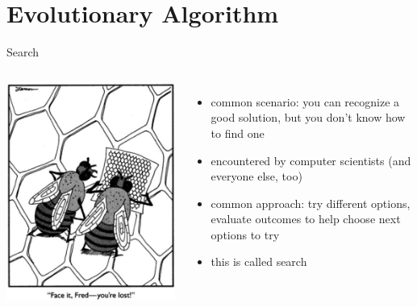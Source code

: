 \section{Evolutionary Algorithm}

\begin{frame}{Search}
  \begin{columns}
  \centering
   \includegraphics[height=\textwidth]{img/farside}
   \begin{itemize}
      \item \alert{common scenario:} you can recognize a good solution, but you don't know how to find one
      \item encountered by computer scientists (and everyone else, too)
      \item \alert{common approach:} try different options, evaluate outcomes to help choose next options to try
       \item this is called \alert{search}    
       \end{itemize}
   \end{columns}
\end{frame}

